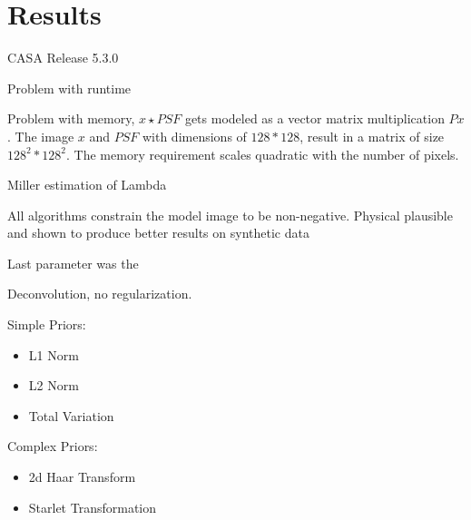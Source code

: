 \section{Results}

CASA Release 5.3.0



Problem with runtime

Problem with memory, $x \star PSF$ gets modeled as a vector matrix multiplication $Px$. The image $x$ and $PSF$ with dimensions of $128 * 128$, result in a matrix of size $128^2 * 128^2$. The memory requirement scales quadratic with the number of pixels. 




Miller estimation of Lambda \cite{miller1970least}

All algorithms constrain the model image to be non-negative. Physical plausible and shown to produce better results on synthetic data \cite{mcewen2011compressed}

Last parameter was the 

Deconvolution, no regularization.

Simple Priors:
\begin{itemize}
	\item L1 Norm
	\item L2 Norm
	\item Total Variation
\end{itemize}

Complex Priors:
\begin{itemize}
	\item 2d Haar Transform
	\item Starlet Transformation
\end{itemize}



